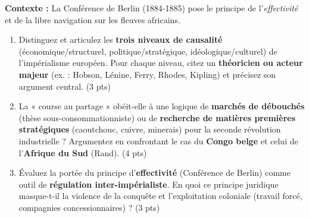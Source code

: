 \documentclass[11pt]{article}
\begin{document}
\begin{exercice}
\textbf{Contexte :} La Conférence de Berlin (1884-1885) pose le principe de l'\textit{effectivité} et de la libre navigation sur les fleuves africains.

\begin{enumerate}
    \item Distinguez et articulez les \textbf{trois niveaux de causalité} (économique/structurel, politique/stratégique, idéologique/culturel) de l'impérialisme européen. Pour chaque niveau, citez un \textbf{théoricien ou acteur majeur} (ex. : Hobson, Lénine, Ferry, Rhodes, Kipling) et précisez son argument central. \hfill (3 pts)
    \item La « course au partage » obéit-elle à une logique de \textbf{marchés de débouchés} (thèse sous-consommationniste) ou de \textbf{recherche de matières premières stratégiques} (caoutchouc, cuivre, minerais) pour la seconde révolution industrielle ? Argumentez en confrontant le cas du \textbf{Congo belge} et celui de l'\textbf{Afrique du Sud} (Rand). \hfill (4 pts)
    \item Évaluez la portée du principe d'\textbf{effectivité} (Conférence de Berlin) comme outil de \textbf{régulation inter-impérialiste}. En quoi ce principe juridique masque-t-il la violence de la conquête et l'exploitation coloniale (travail forcé, compagnies concessionnaires) ? \hfill (3 pts)
\end{enumerate}
\end{exercice}
\end{document}
